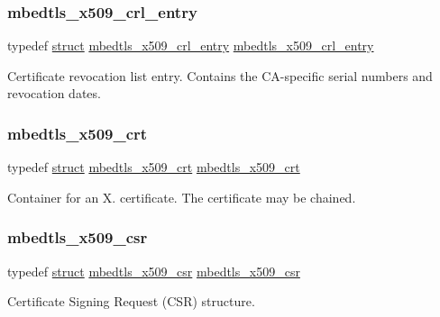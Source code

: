 \subsubsection{\texorpdfstring{mbedtls\+\_\+x509\+\_\+crl\+\_\+entry}{mbedtls\_x509\_crl\_entry}}
{\footnotesize\ttfamily typedef \hyperlink{interfacestruct}{struct} \hyperlink{structmbedtls__x509__crl__entry}{mbedtls\+\_\+x509\+\_\+crl\+\_\+entry}
 \hyperlink{structmbedtls__x509__crl__entry}{mbedtls\+\_\+x509\+\_\+crl\+\_\+entry}}

Certificate revocation list entry. Contains the C\+A-\/specific serial numbers and revocation dates. \mbox{\label{group__x509__module_ga836544fec94d5bc02bc97aa87885b9d9}} 
\subsubsection{\texorpdfstring{mbedtls\+\_\+x509\+\_\+crt}{mbedtls\_x509\_crt}}
{\footnotesize\ttfamily typedef \hyperlink{interfacestruct}{struct} \hyperlink{structmbedtls__x509__crt}{mbedtls\+\_\+x509\+\_\+crt}
 \hyperlink{structmbedtls__x509__crt}{mbedtls\+\_\+x509\+\_\+crt}}

Container for an X. certificate. The certificate may be chained. \mbox{\label{group__x509__module_gae481b23df67001bdac96ef9c2ab3ef7c}} 
\subsubsection{\texorpdfstring{mbedtls\+\_\+x509\+\_\+csr}{mbedtls\_x509\_csr}}
{\footnotesize\ttfamily typedef \hyperlink{interfacestruct}{struct} \hyperlink{structmbedtls__x509__csr}{mbedtls\+\_\+x509\+\_\+csr}
 \hyperlink{structmbedtls__x509__csr}{mbedtls\+\_\+x509\+\_\+csr}}

Certificate Signing Request (C\+SR) structure. \mbox{\label{group__x509__module_ga2272228c7776102328df31623af3168c}} 
